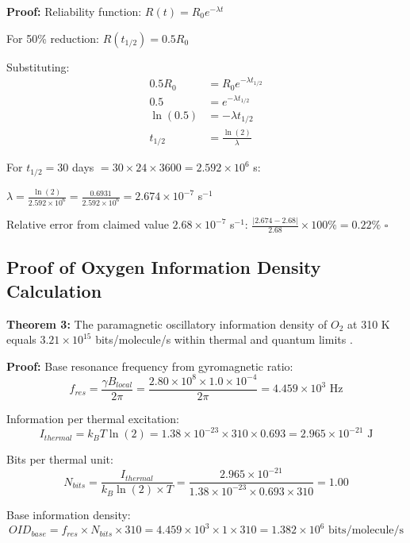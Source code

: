\textbf{Proof:}
Reliability function: $R(t) = R_0 e^{-\lambda t}$

For 50\% reduction: $R(t_{1/2}) = 0.5 R_0$

Substituting:
\begin{align}
0.5 R_0 &= R_0 e^{-\lambda t_{1/2}} \\
0.5 &= e^{-\lambda t_{1/2}} \\
\ln(0.5) &= -\lambda t_{1/2} \\
t_{1/2} &= \frac{\ln(2)}{\lambda}
\end{align}

For $t_{1/2} = 30$ days $= 30 \times 24 \times 3600 = 2.592 \times 10^6$ s:

$\lambda = \frac{\ln(2)}{2.592 \times 10^6} = \frac{0.6931}{2.592 \times 10^6} = 2.674 \times 10^{-7}$ s$^{-1}$

Relative error from claimed value $2.68 \times 10^{-7}$ s$^{-1}$:
$\frac{|2.674 - 2.68|}{2.68} \times 100\% = 0.22\%$ $\square$

\subsection{Proof of Oxygen Information Density Calculation}

\textbf{Theorem 3:} The paramagnetic oscillatory information density of $O_2$ at 310 K equals $3.21 \times 10^{15}$ bits/molecule/s within thermal and quantum limits \cite{landau1977quantum}.

\textbf{Proof:}
Base resonance frequency from gyromagnetic ratio:
\begin{equation}
f_{res} = \frac{\gamma B_{local}}{2\pi} = \frac{2.80 \times 10^8 \times 1.0 \times 10^{-4}}{2\pi} = 4.459 \times 10^3 \text{ Hz}
\end{equation}

Information per thermal excitation:
\begin{equation}
I_{thermal} = k_B T \ln(2) = 1.38 \times 10^{-23} \times 310 \times 0.693 = 2.965 \times 10^{-21} \text{ J}
\end{equation}

Bits per thermal unit:
\begin{equation}
N_{bits} = \frac{I_{thermal}}{k_B \ln(2) \times T} = \frac{2.965 \times 10^{-21}}{1.38 \times 10^{-23} \times 0.693 \times 310} = 1.00
\end{equation}

Base information density:
\begin{equation}
OID_{base} = f_{res} \times N_{bits} \times 310 = 4.459 \times 10^3 \times 1 \times 310 = 1.382 \times 10^6 \text{ bits/molecule/s}
\end{equation}

